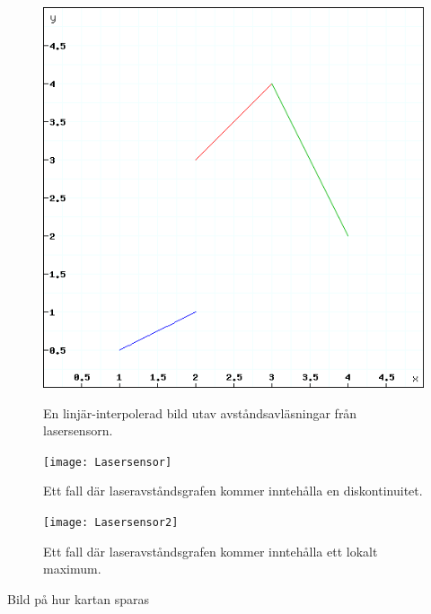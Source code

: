 \documentclass{article}
\begin{document}
\begin{figure}[H]
  \centering
  \includegraphics[scale=0.5]{Laserfunktionskurva} \\
  \caption{En linjär-interpolerad bild utav avståndsavläsningar från lasersensorn.}
  \label{fig:laserfunktionskurva}
\end{figure}

\begin{figure}[H]
  \centering
  \texttt{[image: Lasersensor]} \\
  \caption{Ett fall där laseravståndsgrafen kommer inntehålla en diskontinuitet.}
  \label{fig:lasersensor}
\end{figure}

\begin{figure}[H]
  \centering
  \texttt{[image: Lasersensor2]} \\
  \caption{Ett fall där laseravståndsgrafen kommer inntehålla ett lokalt maximum.}
  \label{fig:lasersensor2}
\end{figure}

Bild på hur kartan sparas
\end{document}
